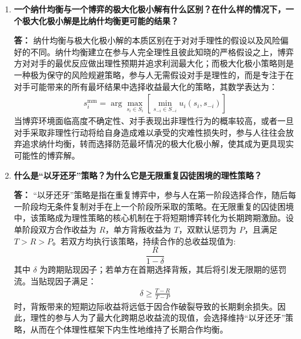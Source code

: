 \begin{enumerate}[label=\textbf{\arabic*.}, leftmargin=*]
		\textbf{答：}
		纳什均衡是指这样一种策略组合，在该组合中，给定其他所有参与人的策略，任何一个参与人选择的策略都是对对手当前策略的最优反应。对于策略组合 $s^* = (s_1^*, \dots, s_n^*)$，若对每个参与人 $i$ 均满足：
		\[
		\begin{aligned}
			u_i(s_i^*, s_{-i}^*) \ge u_i(s_i, s_{-i}^*), \quad \forall s_i \in S_i
		\end{aligned}
		\]
		则该组合构成纳什均衡，此时没有任何参与人有激励单方面改变自己的策略。纳什均衡与占优策略均衡的关键区别在于最优策略对对手行动的依赖性。占优策略均衡要求参与人的最优选择具有绝对独立性，即无论对手如何行动，该策略均为唯一最优；而纳什均衡则表现为条件最优性，即参与人的策略最优性严格依赖于对对手理性行为及策略选择的准确预期。\\因此，占优策略均衡必定是纳什均衡，而纳什均衡不一定是占优策略均衡。
		\newpage
		\item \textbf{一个纳什均衡与一个博弈的极大化极小解有什么区别？在什么样的情况下，一个极大化极小解是比纳什均衡更可能的结果？}
		
		\textbf{答：}
		纳什均衡与极大化极小解的本质区别在于对对手理性的假设以及风险偏好的不同。纳什均衡建立在参与人完全理性且彼此知晓的严格假设之上，博弈方对对手的最优反应做出理性预期并追求利润最大化；而极大化极小策略则是一种极为保守的风险规避策略，参与人无需假设对手是理性的，而是专注于在对手可能带来的所有最坏结果中选择收益最大化的策略，其数学表达为：
		\[
		\begin{aligned}
			s_i^{\text{mm}} = \arg\max_{s_i \in S_i} \left[ \min_{s_{-i} \in S_{-i}} u_i(s_i, s_{-i}) \right]
		\end{aligned}
		\]
		当博弈环境面临高度不确定性、对手表现出非理性行为的概率较高，或者一旦对手采取非理性行动将给自身造成难以承受的灾难性损失时，参与人往往会放弃追求纳什均衡，转而选择防范最坏情况的极大化极小解，使其成为更具现实可能性的博弈解。
		
		\item \textbf{什么是“以牙还牙”策略？为什么它是无限重复囚徒困境的理性策略？}
		
		\textbf{答：}
		“以牙还牙”策略是指在重复博弈中，参与人在第一阶段选择合作，随后每一阶段均无条件复制对手在上一个阶段所采取的策略。在无限重复的囚徒困境中，该策略成为理性策略的核心机制在于将短期博弈转化为长期跨期激励。设单阶段双方合作收益为 $R$，单方背叛收益为 $T$，双默认惩罚为 $P$，且满足 $T > R > P$。若双方均执行该策略，持续合作的总收益现值为: $$\frac{R}{1-\delta}$$其中 $\delta$ 为跨期贴现因子；若单方在首期选择背叛，其后将引发无限期的惩罚流。当贴现因子满足：
		\[
		\begin{aligned}
			\delta \ge \frac{T - R}{T - P}
		\end{aligned}
		\]
		时，背叛带来的短期边际收益将远低于因合作破裂导致的长期剩余损失。因此，理性的参与人为了最大化跨期总收益流的现值，会选择维持“以牙还牙”策略，从而在个体理性框架下内生性地维持了长期合作均衡。
		

\end{enumerate}
